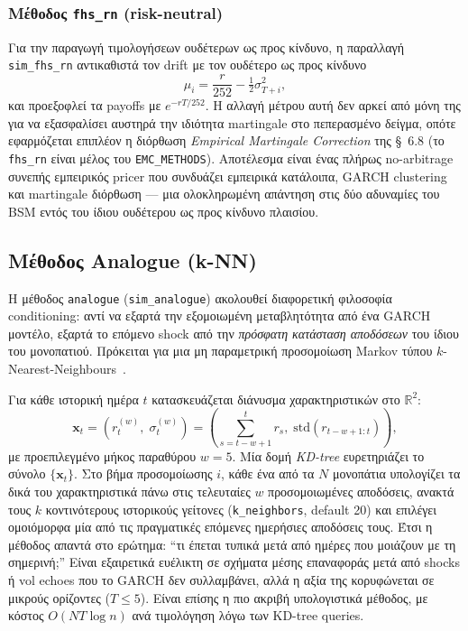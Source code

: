 \documentclass[12pt]{article}
\begin{document}
\subsubsection{Μέθοδος \texttt{fhs\_rn} (risk-neutral)}
Για την παραγωγή τιμολογήσεων ουδέτερων ως προς κίνδυνο, η παραλλαγή \texttt{sim\_fhs\_rn} αντικαθιστά τον drift με τον ουδέτερο ως προς κίνδυνο
\[
  \mu_i = \frac{r}{252} - \tfrac{1}{2}\sigma_{T+i}^{2},
\]
και προεξοφλεί τα payoffs με $e^{-rT/252}$. Η αλλαγή μέτρου αυτή δεν αρκεί από μόνη της για να εξασφαλίσει αυστηρά την ιδιότητα martingale στο πεπερασμένο δείγμα, οπότε εφαρμόζεται επιπλέον η διόρθωση \emph{Empirical Martingale Correction} της \S~6.8 (το \texttt{fhs\_rn} είναι μέλος του \texttt{EMC\_METHODS}). Αποτέλεσμα είναι ένας πλήρως no-arbitrage συνεπής εμπειρικός pricer που συνδυάζει εμπειρικά κατάλοιπα, GARCH clustering και martingale διόρθωση — μια ολοκληρωμένη απάντηση στις δύο αδυναμίες του BSM εντός του ίδιου ουδέτερου ως προς κίνδυνο πλαισίου.

\subsection{Μέθοδος Analogue (k-NN)}
\label{sec:analogue}
Η μέθοδος \texttt{analogue} (\texttt{sim\_analogue}) ακολουθεί διαφορετική φιλοσοφία conditioning: αντί να εξαρτά την εξομοιωμένη μεταβλητότητα από ένα GARCH μοντέλο, εξαρτά το επόμενο shock από την \emph{πρόσφατη κατάσταση αποδόσεων} του ίδιου του μονοπατιού. Πρόκειται για μια μη παραμετρική προσομοίωση Markov τύπου $k$-Nearest-Neighbours~\cite{PaparoditisPolitis2002}.

Για κάθε ιστορική ημέρα $t$ κατασκευάζεται διάνυσμα χαρακτηριστικών στο $\mathbb{R}^{2}$:
\[
  \mathbf{x}_t = \left( r^{(w)}_t,\; \sigma^{(w)}_t \right) =
  \left( \sum_{s=t-w+1}^{t} r_s,\; \mathrm{std}(r_{t-w+1:t}) \right),
\]
με προεπιλεγμένο μήκος παραθύρου $w = 5$. Μία δομή \emph{KD-tree} ευρετηριάζει το σύνολο $\{\mathbf{x}_t\}$. Στο βήμα προσομοίωσης $i$, κάθε ένα από τα $N$ μονοπάτια υπολογίζει τα δικά του χαρακτηριστικά πάνω στις τελευταίες $w$ προσομοιωμένες αποδόσεις, ανακτά τους $k$ κοντινότερους ιστορικούς γείτονες (\texttt{k\_neighbors}, default 20) και επιλέγει ομοιόμορφα μία από τις πραγματικές επόμενες ημερήσιες αποδόσεις τους. Έτσι η μέθοδος απαντά στο ερώτημα: ``τι έπεται τυπικά μετά από ημέρες που μοιάζουν με τη σημερινή;'' Είναι εξαιρετικά ευέλικτη σε σχήματα μέσης επαναφοράς μετά από shocks ή vol echoes που το GARCH δεν συλλαμβάνει, αλλά η αξία της κορυφώνεται σε μικρούς ορίζοντες ($T \leq 5$). Είναι επίσης η πιο ακριβή υπολογιστικά μέθοδος, με κόστος $O(N T \log n)$ ανά τιμολόγηση λόγω των KD-tree queries.
\end{document}

